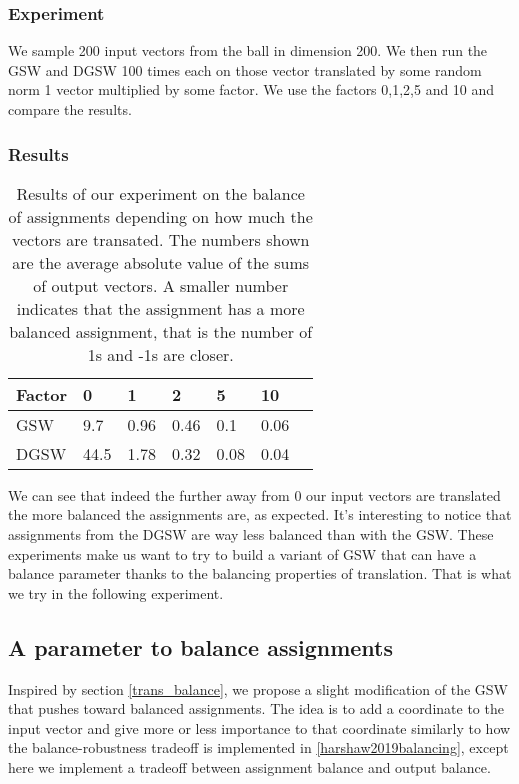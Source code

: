 \documentclass[12pt]{article}
\begin{document}
\subsubsection{Experiment}
We sample 200 input vectors from the ball in dimension 200. We then run the GSW and DGSW 100 times each on those vector translated by some random norm 1 vector multiplied by some factor. We use the factors 0,1,2,5 and 10 and compare the results.

\subsubsection{Results}
\begin{center}
\begin{table}[h]
\begin{tabular}{l|llllll}
 Factor & 0 & 1  & 2 & 5 & 10  \\
\hline
GSW  & 9.7 & 0.96 & 0.46 & 0.1 & 0.06 \\
DGSW & 44.5 & 1.78 & 0.32 & 0.08 & 0.04
\end{tabular}
\caption{Results of our experiment on the balance of assignments depending on how much the vectors are transated. The numbers shown are the average absolute value of the sums of output vectors. A smaller number indicates that the assignment has a more balanced assignment, that is the number of 1s and -1s are closer.}
\label{balance_when_translated}
\end{table}
\end{center}

We can see that indeed the further away from 0 our input vectors are translated the more balanced the assignments are, as expected. It's interesting to notice that assignments from the DGSW are way less balanced than with the GSW. These experiments make us want to try to build a variant of GSW that can have a balance parameter thanks to the balancing properties of translation. That is what we try in the following experiment.

\subsection{A parameter to balance assignments}
Inspired by section \ref{trans_balance}, we propose a slight modification of the GSW that pushes toward balanced assignments. The idea is to add a coordinate to the input vector and give more or less importance to that coordinate similarly to how the balance-robustness tradeoff is implemented in \ref{harshaw2019balancing}, except here we implement a tradeoff between assignment balance and output balance.
\end{document}
